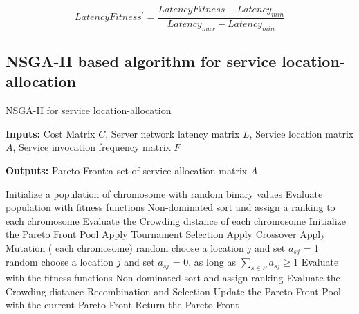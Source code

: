 \documentclass{llncs}
\begin{document}
	\begin{equation}
		LatencyFitness^\prime = \frac{LatencyFitness - Latency_{min}}{Latency_{max} - Latency_{min}}
	\end{equation}




\subsection{NSGA-II based algorithm for service location-allocation}
\begin{algorithm}[htb]
	\caption{NSGA-II for service location-allocation}
	\label{NSGA2}
	\textbf{Inputs:}
		Cost Matrix $C$,
		Server network latency matrix $L$, 
		Service location matrix $A$, 
		Service invocation frequency matrix $F$

	\textbf{Outputs:}
		Pareto Front:a  set of service allocation matrix $A$

	\begin{algorithmic}[1]
		\State Initialize a population of chromosome with random binary values
		\State Evaluate population with fitness functions
		\State Non-dominated sort and assign a ranking to each chromosome
		\State Evaluate the Crowding distance of each chromosome
		\State Initialize the Pareto Front Pool
		\State Apply Tournament Selection
		\State Apply Crossover 
		\State Apply Mutation
		\For( each chromosome)
		\State random choose a location $j$ and set $a_{sj}$ = 1
		\EndWhile
		\State random choose a location $j$ and set $a_{sj}$ = 0, as long as $\sum\limits_{s \in S} a_{sj} \geq 1$
		\EndWhile
		\State Evaluate with the fitness functions
		\EndIf
		\EndFor
		\State Non-dominated sort and assign ranking
		\State Evaluate the Crowding distance
		\State Recombination and Selection
		\State Update the Pareto Front Pool with the current Pareto Front
		\EndWhile
		\State Return the Pareto Front
	\end{algorithmic}
\end{algorithm}
\end{document}
